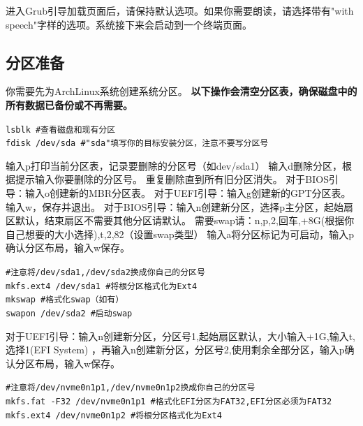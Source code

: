 \documentclass{article}
\newenvironment{singlecolumn}{%
	\par
	\noindent
	\begin{minipage}[t]{\textwidth} %
		\setlength{\parfillskip}{0pt plus 1fil} %
	}{%
	\end{minipage}
	\par
}
\begin{document}
\begin{singlecolumn}
进入Grub引导加载页面后，请保持默认选项。如果你需要朗读，请选择带有"with speech"字样的选项。系统接下来会启动到一个终端页面。

\medskip

\begin{tcolorbox}
	\section*{分区准备}
\end{tcolorbox}

你需要先为ArchLinux系统创建系统分区。 
\textcolor{code}{\textbf{以下操作会清空分区表，确保磁盘中的所有数据已备份或不再需要。} }
\begin{tcolorbox}[
	title=bash,
	boxrule=1pt,
	fonttitle=\bfseries,
	listing only, 
	listing options={language=bash}
	]
	\verb|lsblk #查看磁盘和现有分区|\\
	\verb|fdisk /dev/sda #"sda"填写你的目标安装分区，注意不要写分区号|\\
\end{tcolorbox}
输入p打印当前分区表，记录要删除的分区号（如dev/sda1）
输入d删除分区，根据提示输入你要删除的分区号。
重复删除直到所有旧分区消失。
\textcolor{bios}{对于BIOS引导：输入o创建新的MBR分区表。}
\textcolor{uefi}{对于UEFI引导：输入g创建新的GPT分区表。}
输入\textcolor{code}{w}，保存并退出。
\textcolor{bios}{对于BIOS引导：输入n创建新分区，选择p主分区，起始扇区默认，结束扇区不需要其他分区请默认。
需要swap请：\textcolor{code}{n,p,2,回车,+8G(根据你自己想要的大小选择),t,2,82（设置swap类型）
输入a将分区标记为可启动，输入p确认分区布局，输入w保存。}}\\
\begin{tcolorbox}[
	title=bash,
	boxrule=1pt,
	fonttitle=\bfseries,
	listing only, 
	listing options={language=bash}
	]
	\verb|#注意将/dev/sda1,/dev/sda2换成你自己的分区号|\\
	\verb|mkfs.ext4 /dev/sda1 #将根分区格式化为Ext4|\\
	\verb|mkswap #格式化swap（如有）|\\
	\verb|swapon /dev/sda2 #启动swap|\\
\end{tcolorbox}
\textcolor{uefi}{对于UEFI引导：输入n创建新分区，分区号1,起始扇区默认，大小输入+1G,输入t,选择1(EFI System) ，再输入n创建新分区，分区号2,使用剩余全部分区，输入p确认分区布局，输入w保存。}\\
\begin{tcolorbox}[
	title=bash,
	boxrule=1pt,
	fonttitle=\bfseries,
	listing only, 
	listing options={language=bash}
	]
	\verb|#注意将/dev/nvme0n1p1,/dev/nvme0n1p2换成你自己的分区号|\\
	\verb|mkfs.fat -F32 /dev/nvme0n1p1 #格式化EFI分区为FAT32,EFI分区必须为FAT32|\\
	\verb|mkfs.ext4 /dev/nvme0n1p2 #将根分区格式化为Ext4|\\
\end{tcolorbox}


\end{singlecolumn}
\end{document}
